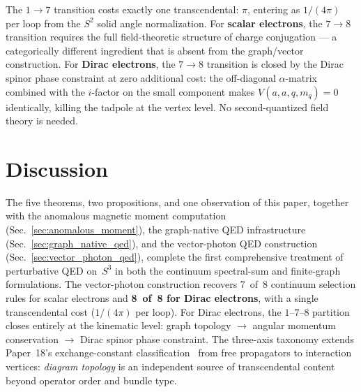 \documentclass[11pt]{article}
\begin{document}
The $1 \to 7$ transition costs exactly one transcendental: $\pi$,
entering as $1/(4\pi)$ per loop from the $S^2$ solid angle
normalization.  For \textbf{scalar electrons}, the $7 \to 8$ transition
requires the full field-theoretic structure of charge conjugation ---
a categorically different ingredient that is absent from the graph/vector
construction.  For \textbf{Dirac electrons}, the $7 \to 8$ transition
is closed by the Dirac spinor phase constraint at zero additional cost:
the off-diagonal $\alpha$-matrix combined with the $i$-factor on the
small component makes $V(a, a, q, m_q) = 0$ identically, killing the
tadpole at the vertex level.  No second-quantized field theory is needed.

\section{Discussion}
\label{sec:discussion}

The five theorems, two propositions, and one observation of this paper,
together with the anomalous magnetic moment computation
(Sec.~\ref{sec:anomalous_moment}), the graph-native QED infrastructure
(Sec.~\ref{sec:graph_native_qed}), and the vector-photon QED construction
(Sec.~\ref{sec:vector_photon_qed}), complete the first comprehensive
treatment of perturbative QED on~$S^3$ in both the continuum spectral-sum
and finite-graph formulations.  The vector-photon construction recovers
7~of~8 continuum selection rules for scalar electrons and
\textbf{8~of~8 for Dirac electrons}, with a single transcendental cost
($1/(4\pi)$ per loop).  For Dirac electrons, the $1$--$7$--$8$
partition closes entirely at the kinematic level: graph topology $\to$
angular momentum conservation $\to$ Dirac spinor phase constraint.
The three-axis taxonomy extends Paper~18's exchange-constant
classification~\cite{paper18} from free propagators to interaction
vertices: \emph{diagram topology} is an independent source of
transcendental content beyond operator order and bundle type.
\end{document}
